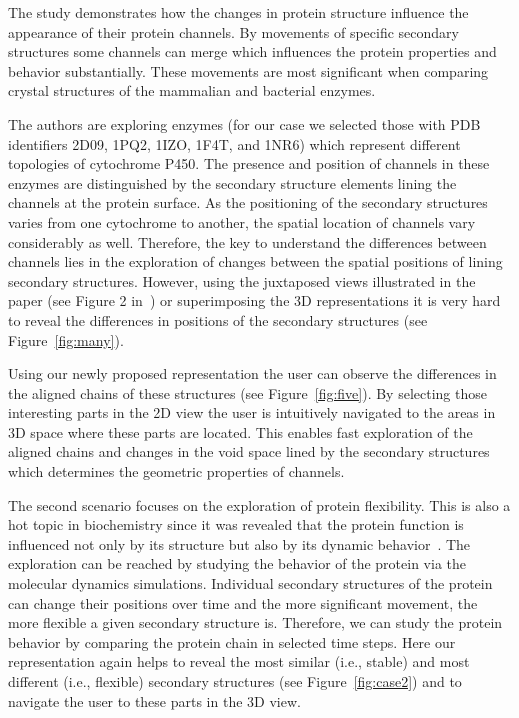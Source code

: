 \documentclass[twocolumn]{bmcart}%
\begin{document}
The study demonstrates how the changes in protein structure influence the appearance of their protein channels.
By movements of specific secondary structures some channels can merge which influences the protein properties and behavior substantially.
These movements are most significant when comparing crystal structures of the mammalian and bacterial enzymes.

The authors are exploring enzymes (for our case we selected those with PDB identifiers 2D09, 1PQ2, 1IZO, 1F4T, and 1NR6) which represent different topologies of cytochrome P450. 
The presence and position of channels in these enzymes are distinguished by the secondary structure elements lining the channels at the protein surface. 
As the positioning of the secondary structures varies from one cytochrome to another, the spatial location of channels vary considerably as well.
Therefore, the key to understand the differences between channels lies in the exploration of changes between the spatial positions of lining secondary structures.
However, using the juxtaposed views illustrated in the paper (see Figure 2 in~\cite{Cojocaru2007}) or superimposing the 3D representations it is very hard to reveal the differences in positions of the secondary structures (see Figure~\ref{fig:many}).

Using our newly proposed representation the user can observe the differences in the aligned chains of these structures (see Figure~\ref{fig:five}).
By selecting those interesting parts in the 2D view the user is intuitively navigated to the areas in 3D space where these parts are located.
This enables fast exploration of the aligned chains and changes in the void space lined by the secondary structures which determines the geometric properties of channels.


The second scenario focuses on the exploration of protein flexibility.
This is also a hot topic in biochemistry since it was revealed that the protein function is influenced not only by its structure but also by its dynamic behavior~\cite{Hensen2012}.
The exploration can be reached by studying the behavior of the protein via the molecular dynamics simulations.
Individual secondary structures of the protein can change their positions over time and the more significant movement, the more flexible a given secondary structure is.
Therefore, we can study the protein behavior by comparing the protein chain in selected time steps.
Here our representation again helps to reveal the most similar (i.e., stable) and most different (i.e., flexible) secondary structures (see Figure~\ref{fig:case2}) and to navigate the user to these parts in the 3D view.
\end{document}
